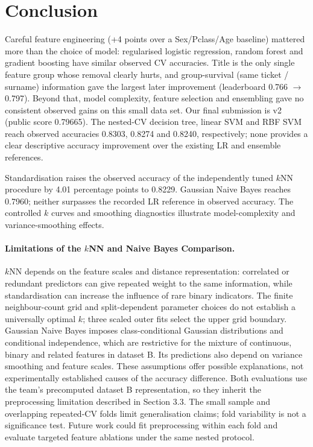\documentclass[10pt,twocolumn]{article}
\begin{document}
\section{Conclusion}
Careful feature engineering (+4 points over a Sex/Pclass/Age baseline) mattered more than the choice of model: regularised
logistic regression, random forest and gradient boosting have similar observed CV accuracies. Title is the only single feature group
whose removal clearly hurts, and group-survival
(same ticket / surname) information gave the largest later improvement (leaderboard 0.766 $\to$ 0.797).
Beyond that, model complexity, feature selection and ensembling gave no consistent observed gains on this small data set.
Our final submission is v2 (public score 0.79665). The nested-CV decision tree, linear SVM and RBF SVM reach observed accuracies 0.8303, 0.8274 and 0.8240, respectively; none provides a clear descriptive accuracy improvement over the existing LR and ensemble references. 

Standardisation raises the observed accuracy of the independently tuned $k$NN procedure by 4.01 percentage points to 0.8229.
Gaussian Naive Bayes reaches 0.7960; neither surpasses the recorded LR reference in observed accuracy.
The controlled $k$ curves and smoothing diagnostics illustrate model-complexity and variance-smoothing effects.

\paragraph{Limitations of the $k$NN and Naive Bayes Comparison.}
$k$NN depends on the feature scales and distance representation: correlated or redundant predictors can give repeated weight to the same information, while standardisation can increase the influence of rare binary indicators.
The finite neighbour-count grid and split-dependent parameter choices do not establish a universally optimal $k$; three scaled outer fits select the upper grid boundary.
Gaussian Naive Bayes imposes class-conditional Gaussian distributions and conditional independence, which are restrictive for the mixture of continuous, binary and related features in dataset B.
Its predictions also depend on variance smoothing and feature scales.
These assumptions offer possible explanations, not experimentally established causes of the accuracy difference.
Both evaluations use the team's precomputed dataset B representation, so they inherit the preprocessing limitation described in Section 3.3. 
The small sample and overlapping repeated-CV folds limit generalisation claims; fold variability is not a significance test.
Future work could fit preprocessing within each fold and evaluate targeted feature ablations under the same nested protocol.
\end{document}
